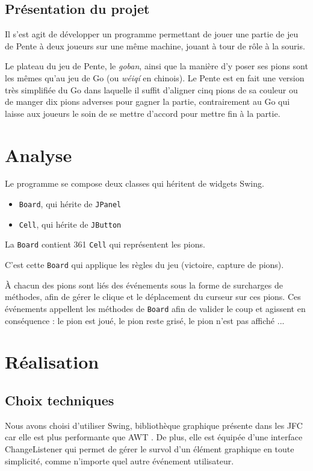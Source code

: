 \documentclass[12pt]{article}
\begin{document}
	\subsection{Présentation du projet}
Il s'est agit de développer un programme permettant de jouer une partie de jeu de Pente\cite{Pente} à deux joueurs sur une même machine, jouant à tour de rôle à la souris.

Le plateau du jeu de Pente, le \textit{goban}, ainsi que la manière d'y poser ses pions sont les mêmes qu'au jeu de Go\cite{Go} (ou \textit{wéiqí} en chinois). Le Pente est en fait une version très simplifiée du Go dans laquelle il suffit d'aligner cinq pions de sa couleur ou de manger dix pions adverses pour gagner la partie, contrairement au Go qui laisse aux joueurs le soin de se mettre d'accord pour mettre fin à la partie.

\section{Analyse}
	Le programme se compose deux classes qui héritent de widgets Swing.
\begin{itemize}
	\item \texttt{Board}, qui hérite de \texttt{JPanel}
	\item \texttt{Cell}, qui hérite de \texttt{JButton}
\end{itemize}

La \texttt{Board} contient 361 \texttt{Cell} qui représentent les pions.

C'est cette \texttt{Board} qui applique les règles du jeu (victoire, capture de pions).

À chacun des pions sont liés des événements sous la forme de surcharges de méthodes, afin de gérer le clique et le déplacement du curseur sur ces pions. Ces événements appellent les méthodes de \texttt{Board} afin de valider le coup et agissent en conséquence : le pion est joué, le pion reste grisé, le pion n'est pas affiché ...

\section{Réalisation}
	\subsection{Choix techniques}
	Nous avons choisi d'utiliser Swing\cite{Swing}, bibliothèque graphique présente dans les JFC\cite{JFC} car elle est plus performante que AWT \cite{AWT}. De plus, elle est équipée d'une interface ChangeListener\cite{ChangeListener} qui permet de gérer le survol d'un élément graphique en toute simplicité, comme n'importe quel autre événement utilisateur.
\end{document}
